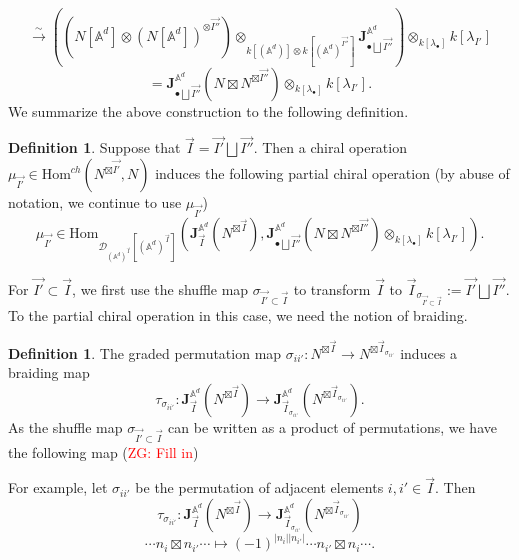 \documentclass[11pt]{amsart}
\theoremstyle{definition}
\newtheorem{defn}[thm]{Definition}
\theoremstyle{remark}
\numberwithin{equation}{section}
\newcommand{\Gui}[1]{(\textcolor{red}{ZG: #1})}
\begin{document}
$$
\xrightarrow{\sim}\left((N[\mathbb{A}^d]\otimes(N[\mathbb{A}^d])^{\otimes \vec{I''}})\otimes_{k[(\mathbb{A}^d)]\otimes k[(\mathbb{A}^d)^{\vec{I''}}]}\mathbf{J}_{\bullet\bigsqcup\vec{{I''}}}^{\mathbb{A}^d}\right)\otimes_{k[\lambda_{\bullet}]} k[\lambda_{I'}]
$$
$$
=\mathbf{J}_{\bullet\bigsqcup\vec{I''}}^{\mathbb{A}^d}(N\boxtimes N^{\boxtimes\vec{I''}})\otimes_{k[\lambda_{\bullet}]}k[\lambda_{I'}].
$$
We summarize the above construction to the following definition.
\begin{defn}

Suppose that $\vec{I}=\vec{I'}\bigsqcup\vec{I''}$. Then a chiral operation $\mu_{\vec{I'}}\in   \mathrm{Hom}^{ch}(N^{\boxtimes\vec{I'}},N)$ induces the following partial chiral operation (by abuse of notation, we continue to use $\mu_{\vec{I'}}$)
$$
\mu_{\vec{I'}}\in \mathrm{Hom}_{\mathcal{D}_{(\mathbb{A}^d)^{\vec{I}}}[(\mathbb{A}^d)^{\vec{I}}]}\left(\mathbf{J}^{\mathbb{A}^d}_{\vec{I}}(N^{\boxtimes\vec{I}}),\mathbf{J}_{\bullet\bigsqcup\vec{I''}}^{\mathbb{A}^d}(N\boxtimes N^{\boxtimes\vec{I''}})\otimes_{k[\lambda_{\bullet}]}k[\lambda_{I'}]\right).
$$
\end{defn}


For $\vec{I'}\subset \vec{I}$, we first use the shuffle map $\sigma_{\vec{I'}\subset\vec{I}}$ to transform $\vec{I}$ to $\vec{I}_{\sigma_{\vec{I'}\subset\vec{I}}}:=\vec{I'}\bigsqcup \vec{I''}$. To the partial chiral operation in this case, we need the notion of braiding.

\begin{defn}
The graded permutation map $\sigma_{ii'}:N^{\boxtimes\vec{I}}\rightarrow N^{\boxtimes \vec{I}_{\sigma_{ii'}}}$ induces a braiding map
$$
        \tau_{\sigma_{ii'}}:\mathbf{J}^{\mathbb{A}^d}_{\vec{I}}(N^{\boxtimes\vec{I}})\rightarrow \mathbf{J}^{\mathbb{A}^d}_{\vec{I}_{\sigma_{ii'}}}(N^{\boxtimes \vec{I}_{\sigma_{ii'}}}).
$$
As the shuffle map $\sigma_{\vec{I'}\subset\vec{I}}$  can be written as a product of permutations, we have the following map
\Gui{Fill in}


For example, let $\sigma_{ii'}$ be the permutation of adjacent elements $i,i'\in\vec{I}$. Then
        $$
        \tau_{\sigma_{ii'}}:\mathbf{J}^{\mathbb{A}^d}_{\vec{I}}(N^{\boxtimes\vec{I}})\rightarrow \mathbf{J}^{\mathbb{A}^d}_{\vec{I}_{\sigma_{ii'}}}(N^{\boxtimes \vec{I}_{\sigma_{ii'}}})
        $$
             $$
        \cdots n_i\boxtimes n_{i'}\cdots\mapsto (-1)^{|n_i||n_{i'}|}\cdots n_{i'}\boxtimes n_{i}\cdots.
        $$
\end{defn}
\end{document}
